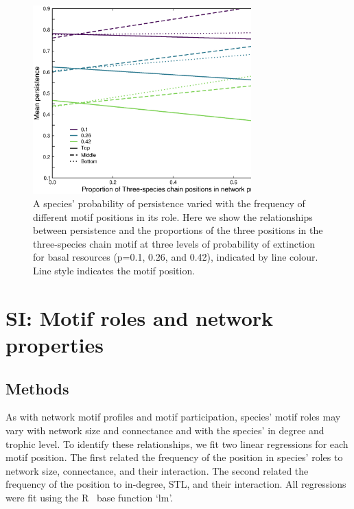 \documentclass[12pt]{article}
\begin{document}
\begin{spacing}{2.0}
    
    \begin{figure}
        \centering
        \includegraphics[width=0.75\textwidth]{figures/persistence_positions_Three-species.eps}
        \caption{A species' probability of persistence varied with the frequency of different motif positions in its role. Here we show the relationships between persistence and the proportions of the three positions in the three-species chain motif at three levels of probability of extinction for basal resources (p=0.1, 0.26, and 0.42), indicated by line colour. Line style indicates the motif  position. }
        \label{fig:chain_positions}
    \end{figure}
        
\clearpage

\section{SI: Motif roles and network properties}

    \subsection*{Methods}
    
        As with network motif profiles and motif participation, species' motif roles may vary with network size and connectance and with the species' in degree and trophic level.
        To identify these relationships, we fit two linear regressions for each motif position.
        The first related the frequency of the position in species' roles to network size, connectance, and their interaction.
        The second related the frequency of the position to in-degree, STL, and their interaction.
        All regressions were fit using the R~\citep{R} base function `lm'.
        

\end{spacing}
\end{document}
